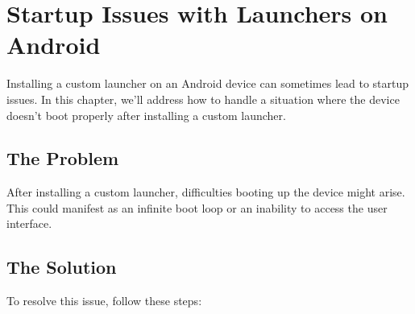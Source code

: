 {\color{teal!90}\chapter{Startup Issues with Launchers on Android}\label{cap:resetting}}


\minitoc%

Installing a custom launcher on an Android device can sometimes lead to startup issues. In this chapter, we'll address how to handle a situation where the device doesn't boot properly after installing a custom launcher.

\section{The Problem}

After installing a custom launcher, difficulties booting up the device might arise. This could manifest as an infinite boot loop or an inability to access the user interface.

\section{The Solution}

To resolve this issue, follow these steps:

